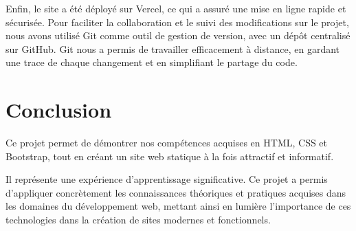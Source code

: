 \documentclass[12pt,twoside,letterpaper]{article}
\begin{document}
\begin{Large}
\vspace{0.5cm}

Enfin, le site a été déployé sur Vercel, ce qui a assuré une mise en ligne rapide et sécurisée. Pour faciliter la collaboration et le suivi des modifications sur le projet, nous avons utilisé Git comme outil de gestion de version, avec un dépôt centralisé sur GitHub. Git nous a permis de travailler efficacement à distance, en gardant une trace de chaque changement et en simplifiant le partage du code.


\section{Conclusion}
Ce projet permet de démontrer nos compétences acquises en HTML, CSS et Bootstrap, tout en créant un site web statique à la fois attractif et informatif. 

Il représente une expérience d'apprentissage significative. Ce projet a permis d'appliquer concrètement les connaissances théoriques et pratiques acquises dans les domaines du développement web, mettant ainsi en lumière l'importance de ces technologies dans la création de sites modernes et fonctionnels.

\end{Large}

\cite{IntroductionAlInternet}
\cite{w3schools2024}
\cite{stackoverflow2024}
\newpage
\printbibliography
\end{document}
